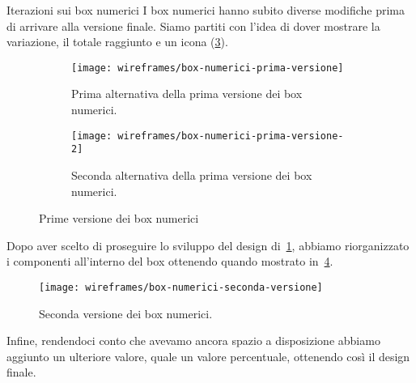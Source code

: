 \documentclass[../../../main.tex]{subfiles}
\begin{document}
\begin{bclogo}{Iterazioni sui box numerici}
    I box numerici hanno subito diverse modifiche prima di arrivare alla versione finale. Siamo partiti con l'idea di dover mostrare la variazione, il totale raggiunto e un icona (\ref{fig:box-numerici-prima-versione}).
\begin{figure}[H]
    \begin{subfigure}[b]{0.5\textwidth}
        \centering
        \texttt{[image: wireframes/box-numerici-prima-versione]}
        \caption{Prima alternativa della prima versione dei box numerici.}
        \label{fig:box-numerici-prima-versione1}
    \end{subfigure}
    \begin{subfigure}[b]{0.5\textwidth}
        \centering
        \texttt{[image: wireframes/box-numerici-prima-versione-2]}
        \caption{Seconda alternativa della prima versione dei box numerici.}
        \label{fig:box-numerici-prima-versione2}
    \end{subfigure}
    \caption{Prime versione dei box numerici}
    \label{fig:box-numerici-prima-versione}
\end{figure}

Dopo aver scelto di proseguire lo sviluppo del design di~\ref{fig:box-numerici-prima-versione1}, abbiamo riorganizzato i componenti all'interno del box ottenendo quando mostrato in~\ref{fig:box-numerici-seconda-versione}.

\begin{figure}[H]
    \centering
    \texttt{[image: wireframes/box-numerici-seconda-versione]}
    \caption{Seconda versione dei box numerici.}
    \label{fig:box-numerici-seconda-versione}
\end{figure}

Infine, rendendoci conto che avevamo ancora spazio a disposizione abbiamo aggiunto un ulteriore valore, quale un valore percentuale, ottenendo così il design finale.
\end{bclogo}
\clearpage
\end{document}
